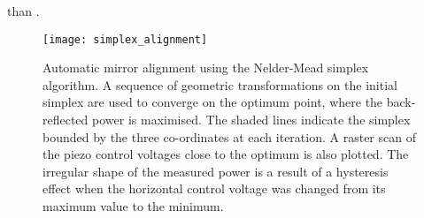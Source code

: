 than .  
\begin{figure}[!htbp] 
  \centering
	\texttt{[image: simplex\_alignment]}
	\caption[Automatic mirror alignment using the Nelder-Mead simplex
		algorithm.]{Automatic mirror alignment using the Nelder-Mead simplex
		algorithm. A sequence of geometric transformations on the initial
    simplex are used to converge on the optimum point, where the
    back-reflected power is maximised. The shaded lines indicate the simplex bounded by
    the three co-ordinates at each iteration.
		A raster scan of the piezo control
		voltages close to the optimum is also plotted. The irregular shape of the
		measured power is a result of a hysteresis effect when the horizontal
		control voltage was changed from its maximum value to the minimum.}
		\label{fig:simplex_optimisation} 
  \end{figure}
